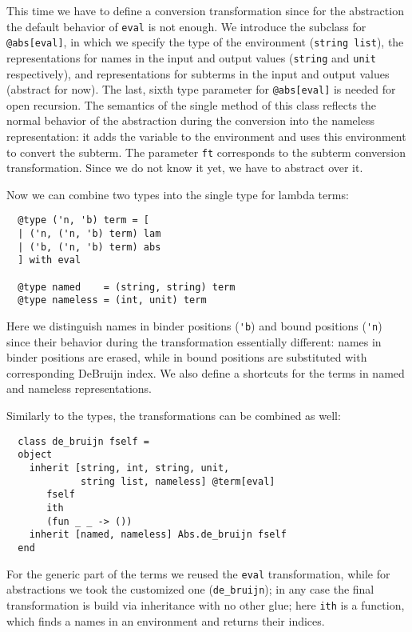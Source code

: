 \documentclass[twocolumn,8pt]{extarticle}
\newcommand{\cd}[1]{\texttt{#1}}
\begin{document}
This time we have to define a conversion transformation since for the abstraction the default behavior of \cd{eval} is not
enough. We introduce the subclass for \cd{@abs[eval]}, in which we specify the type of the environment (\lstinline{string list}),
the representations for names in the input and output values (\lstinline{string} and \lstinline{unit} respectively), and
representations for subterms in the input and output values (abstract for now). The last, sixth type parameter for \cd{@abs[eval]}
is needed for open recursion. The semantics of the single method of this class reflects the normal behavior of the
abstraction during the conversion into the nameless representation: it adds the variable to the environment and uses this
environment to convert the subterm. The parameter \lstinline{ft} corresponds to the subterm conversion transformation. Since
we do not know it yet, we have to abstract over it.

Now we can combine two types into the single type for lambda terms:

\begin{lstlisting}
  @type ('n, 'b) term = [
  | ('n, ('n, 'b) term) lam
  | ('b, ('n, 'b) term) abs
  ] with eval

  @type named    = (string, string) term
  @type nameless = (int, unit) term
\end{lstlisting}

Here we distinguish names in binder positions (\lstinline{'b}) and bound positions (\lstinline{'n}) since their behavior during the
transformation essentially different: names in binder positions are erased, while in bound positions are substituted with corresponding
DeBruijn index. We also define a shortcuts for the terms in named and nameless representations.

Similarly to the types, the transformations can be combined as well:

\begin{lstlisting}
  class de_bruijn fself =
  object
    inherit [string, int, string, unit,
             string list, nameless] @term[eval]
       fself
       ith
       (fun _ _ -> ())
    inherit [named, nameless] Abs.de_bruijn fself
  end
\end{lstlisting}

For the generic part of the terms we reused the \cd{eval} transformation, while for abstractions we took the customized one (\lstinline{de_bruijn}); in
any case the final transformation is build via inheritance with no other glue; here \lstinline{ith} is a function, which finds a names in an
environment and returns their indices.
\end{document}
